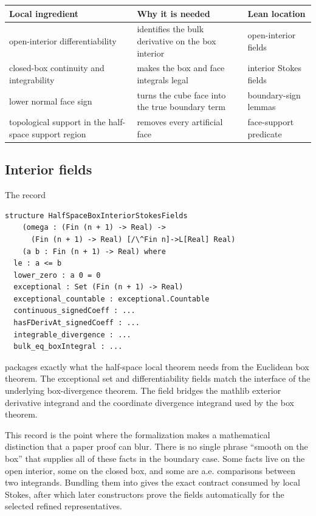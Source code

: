 \begin{center}
\small
\begin{tabular}{p{}p{}p{}}
\hline
Local ingredient & Why it is needed & Lean location \\
\hline
open-interior differentiability & identifies the bulk derivative on the box
interior & open-interior fields \\
closed-box continuity and integrability & makes the box and face integrals
legal & interior Stokes fields \\
lower normal face sign & turns the cube face into the true boundary term &
boundary-sign lemmas \\
topological support in the half-space support region & removes every
artificial face & face-support predicate \\
\hline
\end{tabular}
\end{center}

\subsection{Interior fields}

The record
\begin{lstlisting}[language=Lean]
structure HalfSpaceBoxInteriorStokesFields
    (omega : (Fin (n + 1) -> Real) ->
      (Fin (n + 1) -> Real) [/\^Fin n]->L[Real] Real)
    (a b : Fin (n + 1) -> Real) where
  le : a <= b
  lower_zero : a 0 = 0
  exceptional : Set (Fin (n + 1) -> Real)
  exceptional_countable : exceptional.Countable
  continuous_signedCoeff : ...
  hasFDerivAt_signedCoeff : ...
  integrable_divergence : ...
  bulk_eq_boxIntegral : ...
\end{lstlisting}
packages exactly what the half-space local theorem needs from the Euclidean
box theorem.  The exceptional set and differentiability fields match the
interface of the underlying box-divergence theorem.  The field
 bridges the mathlib exterior derivative integrand
and the coordinate divergence integrand used by the box theorem.

This record is the point where the formalization makes a mathematical
distinction that a paper proof can blur.  There is no single phrase
``smooth on the box'' that supplies all of these facts in the boundary case.
Some facts live on the open interior, some on the closed box, and some are
a.e. comparisons between two integrands.  Bundling them into
 gives the exact contract consumed by
local Stokes, after which later constructors prove the fields automatically
for the selected refined representatives.

